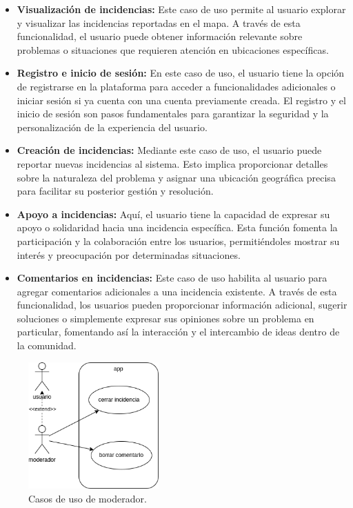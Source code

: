 \documentclass{article}
\begin{document}
\begin{itemize}
    \item \textbf{Visualización de incidencias:} Este caso de uso permite al usuario explorar y visualizar las incidencias reportadas en el mapa. A través de esta funcionalidad, el usuario puede obtener información relevante sobre problemas o situaciones que requieren atención en ubicaciones específicas.

    \item \textbf{Registro e inicio de sesión:} En este caso de uso, el usuario tiene la opción de registrarse en la plataforma para acceder a funcionalidades adicionales o iniciar sesión si ya cuenta con una cuenta previamente creada. El registro y el inicio de sesión son pasos fundamentales para garantizar la seguridad y la personalización de la experiencia del usuario.
    
    \item \textbf{Creación de incidencias:} Mediante este caso de uso, el usuario puede reportar nuevas incidencias al sistema. Esto implica proporcionar detalles sobre la naturaleza del problema y asignar una ubicación geográfica precisa para facilitar su posterior gestión y resolución.
    
    \item \textbf{Apoyo a incidencias:} Aquí, el usuario tiene la capacidad de expresar su apoyo o solidaridad hacia una incidencia específica. Esta función fomenta la participación y la colaboración entre los usuarios, permitiéndoles mostrar su interés y preocupación por determinadas situaciones.
    
    \item \textbf{Comentarios en incidencias:} Este caso de uso habilita al usuario para agregar comentarios adicionales a una incidencia existente. A través de esta funcionalidad, los usuarios pueden proporcionar información adicional, sugerir soluciones o simplemente expresar sus opiniones sobre un problema en particular, fomentando así la interacción y el intercambio de ideas dentro de la comunidad.
\end{itemize}

\begin{figure}[H]
    \center
    \includegraphics[width=5cm]{images/caso_de_uso_moderador.png}
    \caption{Casos de uso de moderador.}
    \label{fig:caso_uso_mod}
\end{figure}
\end{document}
